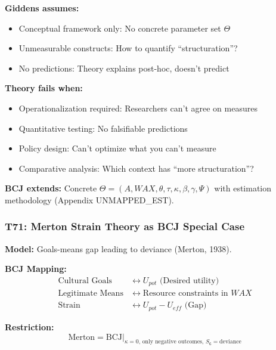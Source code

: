 \begin{tcolorbox}[colback=red!5!white, colframe=red!75!black,
    title=Boundary Condition: Where Giddens Fails]
\textbf{Giddens assumes:}
\begin{itemize}[nosep]
\item Conceptual framework only: No concrete parameter set $\Theta$
\item Unmeasurable constructs: How to quantify ``structuration''?
\item No predictions: Theory explains post-hoc, doesn't predict
\end{itemize}

\textbf{Theory fails when:}
\begin{itemize}[nosep]
\item Operationalization required: Researchers can't agree on measures
\item Quantitative testing: No falsifiable predictions
\item Policy design: Can't optimize what you can't measure
\item Comparative analysis: Which context has ``more structuration''?
\end{itemize}

\textbf{BCJ extends:} Concrete $\Theta = (A, WAX, \theta, \tau, \kappa, \beta, \gamma, \Psi)$ with estimation methodology (Appendix UNMAPPED_EST).
\end{tcolorbox}

\subsubsection*{T71: Merton Strain Theory as BCJ Special Case}

\textbf{Model:} Goals-means gap leading to deviance (Merton, 1938).

\textbf{BCJ Mapping:}
\begin{align}
\text{Cultural Goals} &\leftrightarrow U_{pot} \text{ (Desired utility)} \\
\text{Legitimate Means} &\leftrightarrow \text{Resource constraints in } WAX \\
\text{Strain} &\leftrightarrow U_{pot} - U_{eff} \text{ (Gap)}
\end{align}

\textbf{Restriction:}
\begin{equation}
\text{Merton} = \text{BCJ} \big|_{\kappa = 0, \, \text{only negative outcomes}, \, S_6 = \text{deviance}}
\end{equation}

